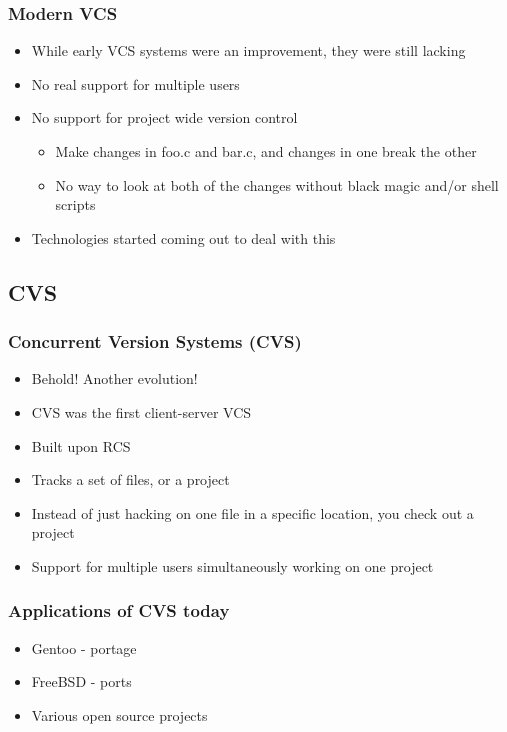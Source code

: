 \documentclass{beamer}
\begin{document}
\begin{frame}
  \frametitle{Modern VCS}
  \begin{itemize}
    \item While early VCS systems were an improvement, they were still lacking
    \item No real support for multiple users
    \item No support for project wide version control
      \begin{itemize}
	\item Make changes in foo.c and bar.c, and changes in one break the other
	\item No way to look at both of the changes without black magic and/or shell scripts
      \end{itemize}
    \item Technologies started coming out to deal with this 
  \end{itemize}
\end{frame}

\subsection{CVS}

\begin{frame}
  \frametitle{Concurrent Version Systems (CVS)}
  \begin{itemize}
    \item Behold! Another evolution!
    \item CVS was the first client-server VCS
    \item Built upon RCS
    \item Tracks a set of files, or a project
    \item Instead of just hacking on one file in a specific location, you check out a project
    \item Support for multiple users simultaneously working on one project
  \end{itemize}
\end{frame}

\begin{frame}
  \frametitle{Applications of CVS today}
  \begin{itemize}
    \item Gentoo - portage
    \item FreeBSD - ports
    \item Various open source projects
  \end{itemize}
\end{frame}
\end{document}
